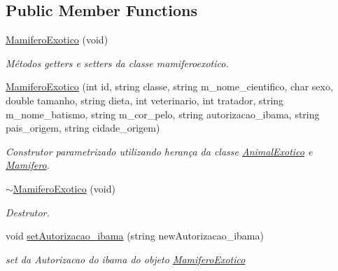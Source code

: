 \subsection*{Public Member Functions}
\begin{DoxyCompactItemize}
\item 
\mbox{\label{class_mamifero_exotico_a93d50a61b9a7ddb8d7098cfc3e7faa55}} 
\mbox{\hyperlink{class_mamifero_exotico_a93d50a61b9a7ddb8d7098cfc3e7faa55}{Mamifero\+Exotico}} (void)
\begin{DoxyCompactList}\small\item\em Métodos getters e setters da classe mamiferoexotico. \end{DoxyCompactList}\item 
\mbox{\label{class_mamifero_exotico_ade30455deae94c92848bc73943e907fa}} 
\mbox{\hyperlink{class_mamifero_exotico_ade30455deae94c92848bc73943e907fa}{Mamifero\+Exotico}} (int id, string classe, string m\+\_\+nome\+\_\+cientifico, char sexo, double tamanho, string dieta, int veterinario, int tratador, string m\+\_\+nome\+\_\+batismo, string m\+\_\+cor\+\_\+pelo, string autorizacao\+\_\+ibama, string pais\+\_\+origem, string cidade\+\_\+origem)
\begin{DoxyCompactList}\small\item\em Construtor parametrizado utilizando herança da classe \mbox{\hyperlink{class_animal_exotico}{Animal\+Exotico}} e \mbox{\hyperlink{class_mamifero}{Mamifero}}. \end{DoxyCompactList}\item 
\mbox{\label{class_mamifero_exotico_aacfc89199146585abe928c95a4e36306}} 
\mbox{\hyperlink{class_mamifero_exotico_aacfc89199146585abe928c95a4e36306}{$\sim$\+Mamifero\+Exotico}} (void)
\begin{DoxyCompactList}\small\item\em Destrutor. \end{DoxyCompactList}\item 
void \mbox{\hyperlink{class_mamifero_exotico_abd667d2810b3aaa7b075435312b6e571}{set\+Autorizacao\+\_\+ibama}} (string new\+Autorizacao\+\_\+ibama)
\begin{DoxyCompactList}\small\item\em set da Autorizacao do ibama do objeto \mbox{\hyperlink{class_mamifero_exotico}{Mamifero\+Exotico}} \end{DoxyCompactList}\item 

\end{DoxyCompactItemize}

